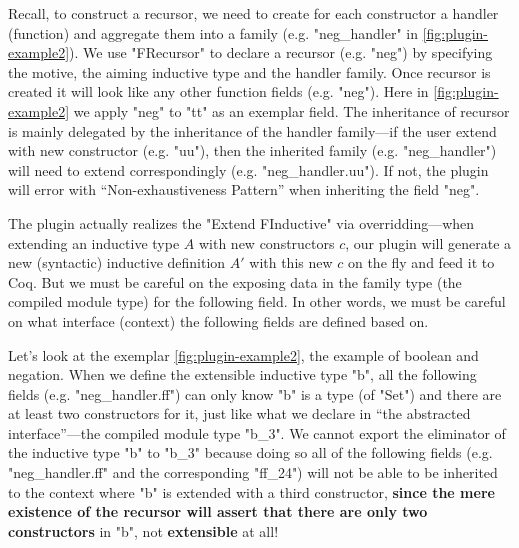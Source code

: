 Recall, to construct a recursor, we need to create for each
constructor a handler (function) and aggregate them into a family (e.g. "neg_handler" in \cref{fig:plugin-example2}). We use "FRecursor" to declare a recursor (e.g. "neg") by specifying the motive, the aiming inductive type and the handler family. Once recursor is created it will look like any other function fields (e.g. "neg"). Here in \cref{fig:plugin-example2} we apply "neg" to "tt" as an exemplar field. The inheritance of recursor is mainly delegated by the inheritance of the handler family---if the user extend with new constructor (e.g. "uu"), then the inherited family (e.g. "neg_handler") will need to extend correspondingly (e.g. "neg_handler.uu"). If not, the plugin will error with ``Non-exhaustiveness Pattern'' when inheriting the field "neg".

The plugin actually realizes the "Extend FInductive" via overridding---when extending an inductive type $A$
with new constructors $c$, our plugin will generate a new (syntactic) inductive definition $A'$ with this new $c$ on the fly and feed it to Coq. But we must be careful on the exposing data in the family type (the compiled module type) for the following field. In other words, we must be careful on what interface (context) the following fields are defined based on. 

Let's look at the exemplar \cref{fig:plugin-example2}, the example of boolean and negation. When we define the extensible inductive type "b", all the following fields (e.g. "neg_handler.ff") can only know "b" is a type (of "Set") and there are at least two constructors for it, just like what we declare in ``the abstracted interface''---the compiled module type "b_3". We cannot export
the eliminator of the inductive type "b" to "b_3" because doing so all of the following fields (e.g. "neg_handler.ff" and the corresponding "ff_24") will not be able to be inherited to the context where "b"
is extended with a third constructor, \textbf{since the mere existence of the recursor will assert that there are only two constructors} in "b", not
\textbf{extensible} at all! 

